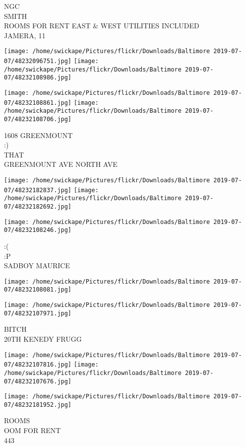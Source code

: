 \documentclass[10pt,letterpaper]{article}
\begin{document}
NGC\\
SMITH\\
ROOMS FOR RENT EAST \& WEST UTILITIES INCLUDED\\
JAMERA, 11
\pagebreak

\texttt{[image: /home/swickape/Pictures/flickr/Downloads/Baltimore 2019-07-07/48232096751.jpg]}
\texttt{[image: /home/swickape/Pictures/flickr/Downloads/Baltimore 2019-07-07/48232108986.jpg]}

\texttt{[image: /home/swickape/Pictures/flickr/Downloads/Baltimore 2019-07-07/48232108861.jpg]}
\texttt{[image: /home/swickape/Pictures/flickr/Downloads/Baltimore 2019-07-07/48232108706.jpg]}

1608 GREENMOUNT\\
:)\\
THAT\\
GREENMOUNT AVE NORTH AVE
\pagebreak

\texttt{[image: /home/swickape/Pictures/flickr/Downloads/Baltimore 2019-07-07/48232182837.jpg]}
\texttt{[image: /home/swickape/Pictures/flickr/Downloads/Baltimore 2019-07-07/48232182692.jpg]}

\vspace{0.25in}
\texttt{[image: /home/swickape/Pictures/flickr/Downloads/Baltimore 2019-07-07/48232108246.jpg]}

:(\\
:P\\
SADBOY MAURICE
\pagebreak

\texttt{[image: /home/swickape/Pictures/flickr/Downloads/Baltimore 2019-07-07/48232108081.jpg]}

\vspace{0.25in}
\texttt{[image: /home/swickape/Pictures/flickr/Downloads/Baltimore 2019-07-07/48232107971.jpg]}

BITCH\\
20TH KENEDY FRUGG
\pagebreak

\texttt{[image: /home/swickape/Pictures/flickr/Downloads/Baltimore 2019-07-07/48232107816.jpg]}
\texttt{[image: /home/swickape/Pictures/flickr/Downloads/Baltimore 2019-07-07/48232107676.jpg]}

\vspace{0.25in}
\texttt{[image: /home/swickape/Pictures/flickr/Downloads/Baltimore 2019-07-07/48232181952.jpg]}

ROOMS\\
OOM FOR RENT\\
443
\pagebreak
\end{document}
